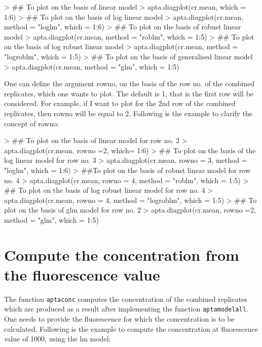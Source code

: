 \documentclass[11pt]{article}
\newcommand{\code}[1]{{\tt #1}}
\begin{document}
\begin{Schunk}
\begin{Sinput}
> ## To plot on the basis of linear model
> apta.diagplot(cr.mean, which = 1:6)
> ## To plot on the basis of log linear model
> apta.diagplot(cr.mean, method = "loglm", which = 1:6)
> ## To plot on the basis of robust linear model
> apta.diagplot(cr.mean, method = "roblm", which = 1:5)
> ## To plot on the basis of log robust linear model
> apta.diagplot(cr.mean, method = "logroblm", which = 1:5)
> ## To plot on the basis of generalised linear model
> apta.diagplot(cr.mean, method = "glm", which = 1:5)
\end{Sinput}
\end{Schunk}

One can define the argument rowno, on the basis of the row no. of the combined replicates, which one
wants to plot. The default is 1, that is the first row will be considered. For example, if I want
to plot for the 2nd row of the combined replicates, then rowno will be equal to 2. Following is
the example to clarify the concept of rowno:

\begin{Schunk}
\begin{Sinput}
> ## To plot on the basis of linear model for row no. 2
> apta.diagplot(cr.mean, rowno =2, which= 1:6)
> ## To plot on the basis of the log linear model for row no. 3
> apta.diagplot(cr.mean, rowno = 3, method = "loglm", which = 1:6)
> ##To plot on the basis of robust linear model for row no. 4
> apta.diagplot(cr.mean, rowno = 4, method = "roblm", which = 1:5)
> ## To plot on the basis of log robust linear model for row no. 4
> apta.diagplot(cr.mean, rowno = 4, method = "logroblm", which = 1:5)
> ## To plot on the basis of glm model for row no. 2
> apta.diagplot(cr.mean, rowno =2, method = "glm", which = 1:5)
\end{Sinput}
\end{Schunk}

\section{Compute the concentration from the fluorescence value}
The function \code{aptaconc} computes the concentration of the combined replicates which are
produced as a result after implementing the function \code{aptamodelall}. One needs to provide
the fluorescence for which the concentration is to be calculated. Following is the example to
compute the concentration at fluorescence value of 1000, using the lm model:
\end{document}
